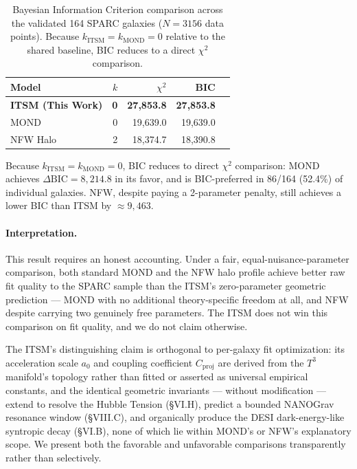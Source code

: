 \documentclass[aps,prd,10pt,twocolumn,superscriptaddress,nofootinbib,floatfix]{revtex4-2}
\begin{document}
\begin{table}[htbp]
\centering
\caption{\footnotesize Bayesian Information Criterion comparison across the validated 164 SPARC galaxies ($N=3156$ data points). Because $k_{\text{ITSM}}=k_{\text{MOND}}=0$ relative to the shared baseline, BIC reduces to a direct $\chi^2$ comparison.}
\label{tab:bic}
\begin{tabular}{lrrrr}
\toprule
\textbf{Model} & \textbf{$k$} & \textbf{$\chi^2$} & \textbf{BIC} \\
\midrule
\textbf{ITSM (This Work)} & \textbf{0} & \textbf{27,853.8} & \textbf{27,853.8} \\
MOND \cite{mond} & 0 & 19,639.0 & 19,639.0 \\
NFW Halo & 2 & 18,374.7 & 18,390.8 \\
\bottomrule
\end{tabular}
\end{table}

Because $k_{\text{ITSM}}=k_{\text{MOND}}=0$, BIC reduces to direct $\chi^2$ comparison: MOND achieves $\Delta\text{BIC}=8{,}214.8$ in its favor, and is BIC-preferred in 86/164 (52.4\%) of individual galaxies. NFW, despite paying a 2-parameter penalty, still achieves a lower BIC than ITSM by $\approx9{,}463$.

\paragraph{Interpretation.} This result requires an honest accounting. Under a fair, equal-nuisance-parameter comparison, both standard MOND and the NFW halo profile achieve better raw fit quality to the SPARC sample than the ITSM's zero-parameter geometric prediction --- MOND with no additional theory-specific freedom at all, and NFW despite carrying two genuinely free parameters. The ITSM does not win this comparison on fit quality, and we do not claim otherwise.

The ITSM's distinguishing claim is orthogonal to per-galaxy fit optimization: its acceleration scale $a_0$ and coupling coefficient $C_{\text{proj}}$ are derived from the $T^3$ manifold's topology rather than fitted or asserted as universal empirical constants, and the identical geometric invariants --- without modification --- extend to resolve the Hubble Tension (\S VI.H), predict a bounded NANOGrav resonance window (\S VIII.C), and organically produce the DESI dark-energy-like syntropic decay (\S VI.B), none of which lie within MOND's or NFW's explanatory scope. We present both the favorable and unfavorable comparisons transparently rather than selectively.
\end{document}
